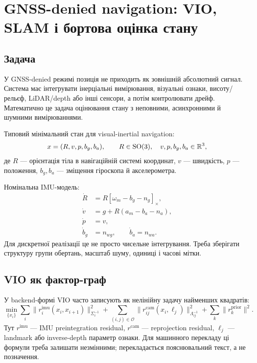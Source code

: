 \chapter{GNSS-denied navigation: VIO, SLAM і бортова оцінка стану}

\section*{Задача}

У GNSS-denied режимі позиція не приходить як зовнішній абсолютний сигнал. Система має інтегрувати інерціальні вимірювання, візуальні ознаки, висоту/рельєф, LiDAR/depth або інші сенсори, а потім контролювати дрейф. Математично це задача оцінювання стану з неповними, асинхронними й шумними вимірюваннями.

Типовий мінімальний стан для visual-inertial navigation:
\[
  x = (R, v, p, b_g, b_a),
  \qquad R\in \mathrm{SO}(3),\quad v,p,b_g,b_a\in\mathbb{R}^3,
\]
де $R$ --- орієнтація тіла в навігаційній системі координат, $v$ --- швидкість, $p$ --- положення, $b_g,b_a$ --- зміщення гіроскопа й акселерометра.

Номінальна IMU-модель:
\[
\begin{aligned}
  \dot R &= R[\omega_m-b_g-n_g]_\times,\\
  \dot v &= g + R(a_m-b_a-n_a),\\
  \dot p &= v,\\
  \dot b_g &= n_{wg},\qquad \dot b_a = n_{wa}.
\end{aligned}
\]
Для дискретної реалізації це не просто чисельне інтегрування. Треба зберігати структуру групи обертань, масштаб шуму, одиниці і часові мітки.

\section*{VIO як фактор-граф}

У backend-формі VIO часто записують як нелінійну задачу найменших квадратів:
\[
  \min_{\{x_i\}}\sum_i \|r^{\mathrm{imu}}_i(x_i,x_{i+1})\|_{\Sigma_i^{-1}}^2
  + \sum_{(i,j)\in\mathcal{O}} \|r^{\mathrm{cam}}_{ij}(x_i,\ell_j)\|_{\Lambda_{ij}^{-1}}^2
  + \sum_k \|r^{\mathrm{prior}}_k\|^2.
\]
Тут $r^{\mathrm{imu}}$ --- IMU preintegration residual, $r^{\mathrm{cam}}$ --- reprojection residual, $\ell_j$ --- landmark або inverse-depth параметр ознаки. Для машинного перекладу ці формули треба залишати незмінними; перекладається пояснювальний текст, а не позначення.

